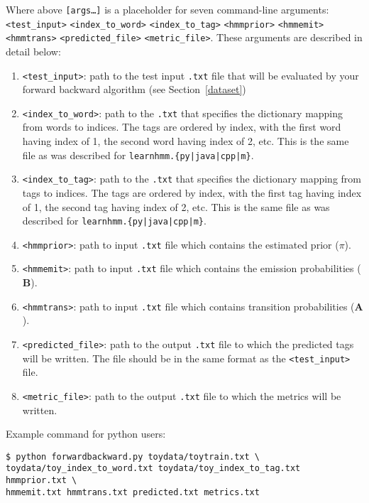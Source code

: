 \documentclass{article}
\begin{document}
Where above \texttt{[args\dots]} is a placeholder for seven command-line arguments:\texttt{<test\_input>} \texttt{<index\_to\_word>} \texttt{<index\_to\_tag>} \texttt{<hmmprior>} \texttt{<hmmemit>} \texttt{<hmmtrans>} \texttt{<predicted\_file>} \texttt{<metric\_file>}. These arguments are described in detail below:
\begin{enumerate}
    \item \texttt{<test\_input>}: path to the test input \texttt{.txt} file that will be evaluated by your forward backward algorithm (see Section~\ref{dataset})
    \item \texttt{<index\_to\_word>}: path to the \texttt{.txt} that specifies the dictionary mapping from words to indices. The tags are ordered by index, with the first word having index of 1, the second word having index of 2, etc. This is the same file as was described for \texttt{learnhmm.\{py|java|cpp|m\}}.
    \item \texttt{<index\_to\_tag>}: path to the \texttt{.txt} that specifies the dictionary mapping from tags to indices. The tags are ordered by index, with the first tag having index of 1, the second tag having index of 2, etc. This is the same file as was described for \texttt{learnhmm.\{py|java|cpp|m\}}.
    \item \texttt{<hmmprior>}: path to input \texttt{.txt} file which contains the estimated prior (\boldmath${\pi}$).
    \item \texttt{<hmmemit>}: path to input \texttt{.txt} file which contains the emission probabilities ($\mathbf B$).
    \item \texttt{<hmmtrans>}: path to input \texttt{.txt} file which contains transition probabilities ($\mathbf A$).
    \item \texttt{<predicted\_file>}: path to the output \texttt{.txt} file to which the predicted tags will be written. The file should be in the same format as the \texttt{<test\_input>} file. 
    \item \texttt{<metric\_file>}: path to the output \texttt{.txt} file to which the metrics will be written. 
\end{enumerate}


Example command for python users:
\begin{lstlisting}
$ python forwardbackward.py toydata/toytrain.txt \
toydata/toy_index_to_word.txt toydata/toy_index_to_tag.txt hmmprior.txt \
hmmemit.txt hmmtrans.txt predicted.txt metrics.txt
\end{lstlisting}
\end{document}
